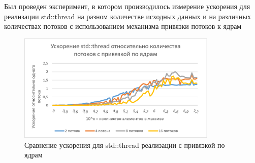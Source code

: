 \documentclass{report}
\begin{document}
\par Был проведен эксперимент, в котором производилось измерение ускорения для реализации std::thread на разном количестве исходных данных и на различных количествах потоков с использованием механизма привязки потоков к ядрам
\begin{figure}[H]
    \centering
    \includegraphics[width=0.85\textwidth]{boost_std_with_affinity.png}
    \caption{Сравнение ускорения для std::thread реализации с привязкой по ядрам}
    \label{fig:my_label_6}
\end{figure}

\newpage

\end{document}
